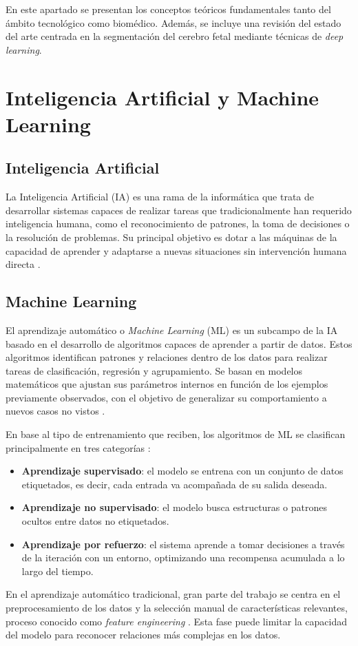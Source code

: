 
En este apartado se presentan los conceptos teóricos fundamentales tanto del ámbito tecnológico como biomédico. Además, se incluye una revisión del estado del arte centrada en la segmentación del cerebro fetal mediante técnicas de \textit{deep learning}. 

\section{Inteligencia Artificial y Machine Learning}
\subsection{Inteligencia Artificial}
La Inteligencia Artificial (IA) es una rama de la informática que trata de desarrollar sistemas capaces de realizar tareas que tradicionalmente han requerido inteligencia humana, como el reconocimiento de patrones, la toma de decisiones o la resolución de problemas. Su principal objetivo es dotar a las máquinas de la capacidad de aprender y adaptarse a nuevas situaciones sin intervención humana directa \cite{russell2010ia}.

\subsection{Machine Learning}
El aprendizaje automático o \textit{Machine Learning} (ML) es un subcampo de la IA basado en el desarrollo de algoritmos capaces de aprender a partir de datos. Estos algoritmos identifican patrones y relaciones dentro de los datos para realizar tareas de clasificación, regresión y agrupamiento. Se basan en modelos matemáticos que ajustan sus parámetros internos en función de los ejemplos previamente observados, con el objetivo de generalizar su comportamiento a nuevos casos no vistos \cite{mitchell1997ml}.

En base al tipo de entrenamiento que reciben, los algoritmos de ML se clasifican principalmente en tres categorías \cite{mitchell1997ml}:
\begin{itemize}
    \item \textbf{Aprendizaje supervisado}: el modelo se entrena con un conjunto de datos etiquetados, es decir, cada entrada va acompañada de su salida deseada. 
    \item \textbf{Aprendizaje no supervisado}: el modelo busca estructuras o patrones ocultos entre datos no etiquetados.
    \item \textbf{Aprendizaje por refuerzo}: el sistema aprende a tomar decisiones a través de la iteración con un entorno, optimizando una recompensa acumulada a lo largo del tiempo. 
\end{itemize} 
En el aprendizaje automático tradicional, gran parte del trabajo se centra en el preprocesamiento de los datos y la selección manual de características relevantes, proceso conocido como \textit{feature engineering} \cite{ng2020yearning}. Esta fase puede limitar la capacidad del modelo para reconocer relaciones más complejas en los datos.

